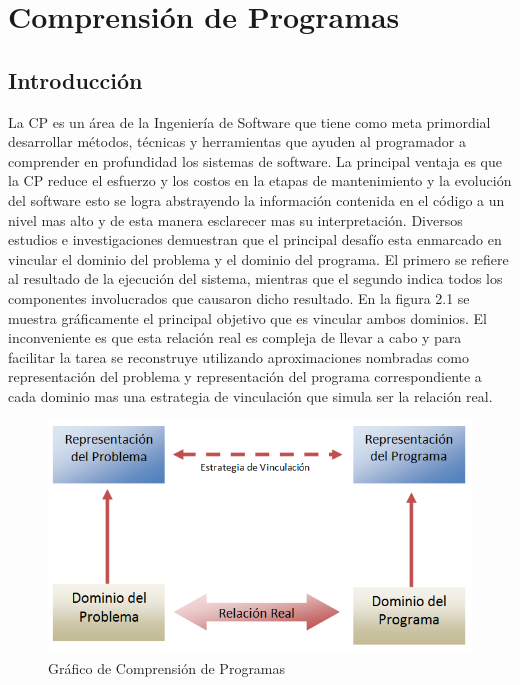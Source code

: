\documentclass[12pt]{report}
\begin{document}
\chapter{Comprensión de Programas}
\section{Introducción}
La CP es un área de la Ingeniería de Software que tiene como meta primordial desarrollar métodos, técnicas y herramientas que ayuden al programador a comprender en profundidad los sistemas de software. La principal ventaja es que la CP reduce el esfuerzo y los costos en la etapas de mantenimiento y la evolución del software esto se logra abstrayendo la información contenida en el código a un nivel mas alto y de esta manera esclarecer mas su interpretación.\cite{MPMR07}
Diversos estudios e investigaciones demuestran que el principal desafío esta enmarcado en vincular el dominio del problema y el dominio del programa. El primero se refiere al resultado de la ejecución del sistema, mientras que el segundo indica todos los componentes involucrados que causaron dicho resultado. En la figura 2.1 se muestra gráficamente el principal objetivo que es vincular ambos dominios. El inconveniente es que esta relación real es compleja de llevar a cabo y para facilitar la tarea se reconstruye utilizando aproximaciones nombradas como representación del problema y representación del programa correspondiente a cada dominio mas una estrategia de vinculación que simula ser la relación real.

\begin{figure}[h] %
\centering
\includegraphics[scale= 0.25]{./dom.png}
\caption{Gráfico de Comprensión de Programas}
\end{figure} \label{captura1}
\end{document}
